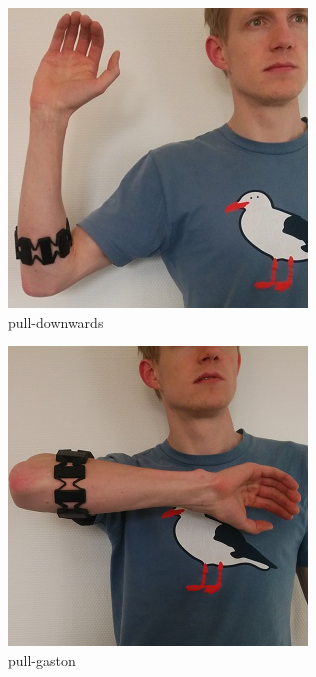 \documentclass[journal]{IEEEtran}
\begin{document}
\begin{figure}[t!]
    \begin{subfigure}{0.25\textwidth}
        \centering
        \includegraphics[width=.8\linewidth]{img/pull-downwards}
        \caption{pull-downwards}
    \end{subfigure}%
        \begin{subfigure}{0.25\textwidth}
        \centering
        \includegraphics[width=.8\linewidth]{img/pull-gaston}
        \caption{pull-gaston}
    \end{subfigure}%
        \begin{subfigure}{0.25\textwidth}

\end{subfigure}
\end{figure}
\end{document}
